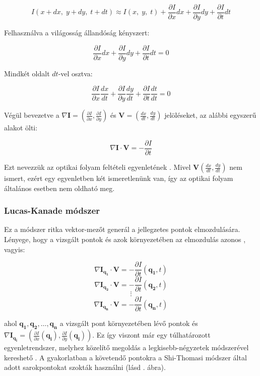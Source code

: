 \[I(x+dx,\; y+dy,\; t+dt) \approx I(x,\; y,\; t) + \frac{\partial I}{\partial x} dx + \frac{\partial I}{\partial y} dy + \frac{\partial I}{\partial t} dt\]

Felhasználva a világosság állandóság kényszert:

\[\frac{\partial I}{\partial x} dx + \frac{\partial I}{\partial y} dy + \frac{\partial I}{\partial t} dt = 0\]

Mindkét oldalt $dt$-vel osztva:

\[\frac{\partial I}{\partial x} \frac{dx}{dt} + \frac{\partial I}{\partial y} \frac{dy}{dt} + \frac{\partial I}{\partial t} \frac{dt}{dt} = 0\]

Végül bevezetve a $\nabla \mathbf{I} = \left(\frac{\partial I}{\partial x}, \frac{\partial I}{\partial y}\right)$ és $\mathbf{V} = \left(\frac{dx}{dt}, \frac{dy}{dt}\right)$ jelöléseket, az alábbi egyszerű alakot ölti:

\[\nabla \mathbf{I} \cdot \mathbf{V} = -\frac{\partial I}{\partial t}\]

Ezt nevezzük az optikai folyam feltételi egyenletének \cite{phd}. Mivel $\mathbf{V}\left(\frac{dx}{dt}, \frac{dy}{dt}\right)$ nem ismert, ezért egy egyenletben két ismeretlenünk van, így az optikai folyam általános esetben nem oldható meg.

\subsubsection{Lucas-Kanade módszer \cite{LK}}

Ez a módszer ritka vektor-mezőt generál a jellegzetes pontok elmozdulására. Lényege, hogy a vizsgált pontok és azok környezetében az elmozdulás azonos \cite{lk-wiki}, vagyis:

\[\nabla \mathbf{I}_{\mathbf{q_1}} \cdot \mathbf{V} = -\frac{\partial I}{\partial t}(\mathbf{q_1}, t)\]
\[\nabla \mathbf{I}_{\mathbf{q_2}} \cdot \mathbf{V} = -\frac{\partial I}{\partial t}(\mathbf{q_2}, t)\]
\[\vdots\]
\[\nabla \mathbf{I}_{\mathbf{q_n}} \cdot \mathbf{V} = -\frac{\partial I}{\partial t}(\mathbf{q_n}, t)\]

ahol $\mathbf{q_1},\mathbf{q_2},\ldots,\mathbf{q_n}$ a vizsgált pont környezetében lévő pontok és $\nabla \mathbf{I}_{\mathbf{q_i}} = \left(\frac{\partial I}{\partial x}(\mathbf{q_i}), \frac{\partial I}{\partial y}(\mathbf{q_i})\right)$. Ez így viszont már egy túlhatározott egyenletrendszer, melyhez közelítő megoldás a legkisebb-négyzetek módszerével kereshető \cite{LK, lk-wiki}. A gyakorlatban a követendő pontokra a Shi-Thomasi \cite{shi-thomasi} módszer által adott sarokpontokat szokták használni (lásd . ábra).

